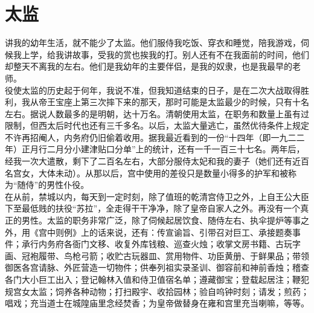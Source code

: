 \fancyhead[RO]{\thepage} %
\fancyhead[LE]{\thepage} %
\chapter*{太监}
讲我的幼年生活，就不能少了太监。他们服侍我吃饭、穿衣和睡觉，陪我游戏，伺候我上学，给我讲故事，受我的赏也挨我的打。别人还有不在我面前的时间，他们却整天不离我的左右。他们是我幼年的主要伴侣，是我的奴隶，也是我最早的老师。\\

役使太监的历史起于何年，我说不准，但我知道结束的日子，是在二次大战取得胜利，我从帝王宝座上第三次摔下来的那天，那时可能是太监最少的时候，只有十名左右。据说人数最多的是明朝，达十万名。清朝使用太监，在职务和数量上虽有过限制，但西太后时代也还有三千多名。以后，太监大量逃亡，虽然优待条件上规定不许再招阉人，内务府仍旧偷着收用。据我最近看到的一份“十四年（即一九二二年）正月行二月分小建津贴口分单”上的统计，还有一千一百三十七名。两年后，经我一次大遣散，剩下了二百名左右，大部分服侍太妃和我的妻子（她们还有近百名宫女，大体未动）。从那以后，宫中使用的差役只是数量小得多的护军和被称为“随侍”的男性仆役。\\

在从前，禁城以内，每天到一定时刻，除了值班的乾清宫侍卫之外，上自王公大臣下至最低贱的扶役“苏拉”，全走得干干净净，除了皇帝自家人之外。再没有一个真正的男性。太监的职务非常广泛，除了伺候起居饮食、随侍左右、执伞提炉等事之外，用《宫中则例》上的话来说，还有：传宣谕旨、引带召对巨工、承接题奏事件；承行内务府各衙门文移、收复外库钱粮、巡查火烛；收掌文房书籍、古玩字画、冠袍履带、鸟枪弓箭；收贮古玩器皿、赏用物件、功臣黄册、于鲜果品；带领御医各宫请脉、外匠营造一切物件；供奉列祖实录圣训、御容前和神前香烛；稽查各门大小巨工出入；登记翰林入值和侍卫值宿名单；遵藏御宝；登载起居注；鞭犯规宫女太监；饲养各种动物；打扫殿宇、收拾园林；验自呜钟时刻；请发；煎药；唱戏；充当道士在城隍庙里念经焚香；为皇帝做替身在雍和宫里充当喇嘛，等等。\\

